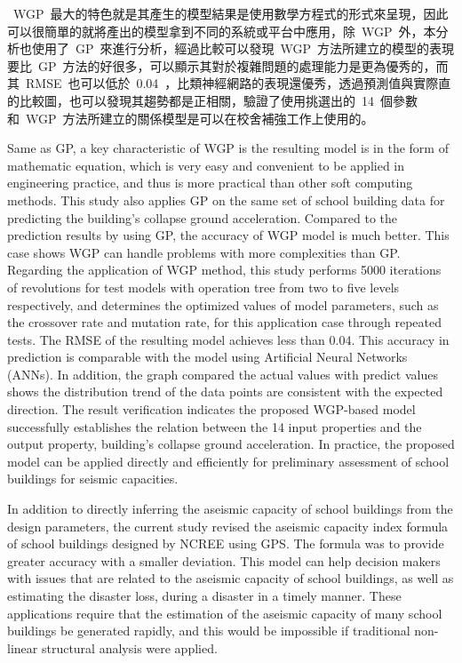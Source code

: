 ~WGP~最大的特色就是其產生的模型結果是使用數學方程式的形式來呈現，因此可以很簡單的就將產出的模型拿到不同的系統或平台中應用，除~WGP~外，本分析也使用了~GP~來進行分析，經過比較可以發現~WGP~方法所建立的模型的表現要比~GP~方法的好很多，可以顯示其對於複雜問題的處理能力是更為優秀的，而其~RMSE~也可以低於~0.04~，比類神經網路的表現還優秀，透過預測值與實際直的比較圖，也可以發現其趨勢都是正相關，驗證了使用挑選出的~14~個參數和~WGP~方法所建立的關係模型是可以在校舍補強工作上使用的。

Same as GP, a key characteristic of WGP is the resulting model is in the form of mathematic equation, which is very easy and convenient to be applied in engineering practice, and thus is more practical than other soft computing methods. This study also applies GP on the same set of school building data for predicting the building’s collapse ground acceleration. Compared to the prediction results by using GP, the accuracy of WGP model is much better. This case shows WGP can handle problems with more complexities than GP. Regarding the application of WGP method, this study performs 5000 iterations of revolutions for test models with operation tree from two to five levels respectively, and determines the optimized values of model parameters, such as the crossover rate and mutation rate, for this application case through repeated tests. The RMSE of the resulting model achieves less than 0.04. This accuracy in prediction is comparable with the model using Artificial Neural Networks (ANNs). In addition, the graph compared the actual values with predict values shows the distribution trend of the data points are consistent with the expected direction. The result verification indicates the proposed WGP-based model successfully establishes the relation between the 14 input properties and the output property, building’s collapse ground acceleration. In practice, the proposed model can be applied directly and efficiently for preliminary assessment of school buildings for seismic capacities.



In addition to directly inferring the aseismic capacity of school buildings from the design parameters, the current study revised the aseismic capacity index formula of school buildings designed by NCREE using GPS. The formula was to provide greater accuracy with a smaller deviation. This model can help decision makers with issues that are related to the aseismic capacity of school buildings, as well as estimating the disaster loss, during a disaster in a timely manner. These applications require that the estimation of the aseismic capacity of many school buildings be generated rapidly, and this would be impossible if traditional non-linear structural analysis were applied.

